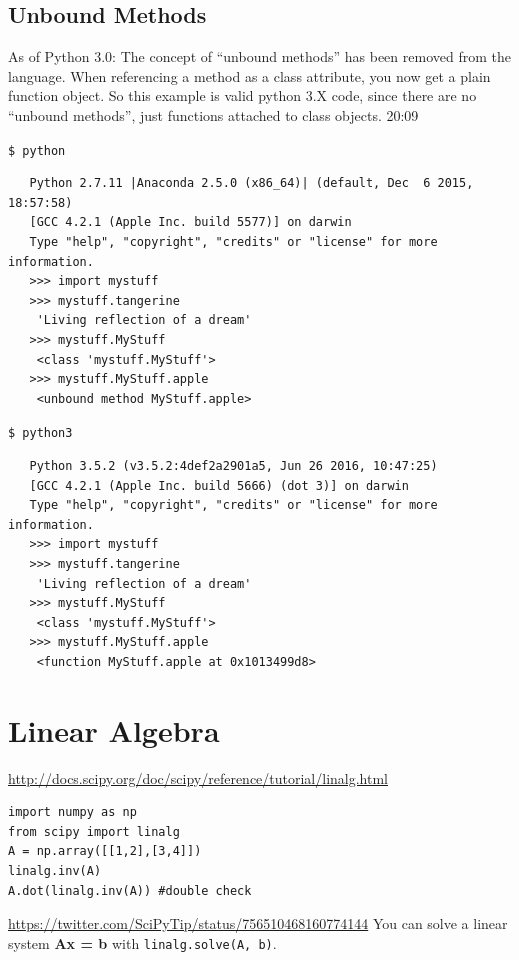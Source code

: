 \documentclass[11pt,a4paper]{article}
\begin{document}
     \subsection{Unbound Methods}
     As of Python 3.0: The concept of ``unbound methods'' has been
removed from the language. When referencing a method as a class
attribute, you now get a plain function object. So this example is
valid python 3.X code, since there are no ``unbound methods'', just
functions attached to class objects.  %
20:09

     {\tt \$ python}
    \begin{lstlisting}
   Python 2.7.11 |Anaconda 2.5.0 (x86_64)| (default, Dec  6 2015, 18:57:58) 
   [GCC 4.2.1 (Apple Inc. build 5577)] on darwin
   Type "help", "copyright", "credits" or "license" for more information.
   >>> import mystuff
   >>> mystuff.tangerine
    'Living reflection of a dream'
   >>> mystuff.MyStuff
    <class 'mystuff.MyStuff'>
   >>> mystuff.MyStuff.apple
    <unbound method MyStuff.apple>
     \end{lstlisting}

     {\tt \$ python3}
    \begin{lstlisting}
   Python 3.5.2 (v3.5.2:4def2a2901a5, Jun 26 2016, 10:47:25) 
   [GCC 4.2.1 (Apple Inc. build 5666) (dot 3)] on darwin
   Type "help", "copyright", "credits" or "license" for more information.
   >>> import mystuff
   >>> mystuff.tangerine
    'Living reflection of a dream'
   >>> mystuff.MyStuff
    <class 'mystuff.MyStuff'>
   >>> mystuff.MyStuff.apple
    <function MyStuff.apple at 0x1013499d8>
    \end{lstlisting}




\newpage
\section{Linear Algebra}
\href{http://docs.scipy.org/doc/scipy/reference/tutorial/linalg.html}{http://docs.scipy.org/doc/scipy/reference/tutorial/linalg.html}

\begin{lstlisting}
import numpy as np
from scipy import linalg
A = np.array([[1,2],[3,4]])
linalg.inv(A)
A.dot(linalg.inv(A)) #double check
\end{lstlisting}

\noindent
\href{https://twitter.com/SciPyTip/status/756510468160774144}{https://twitter.com/SciPyTip/status/756510468160774144}
You can solve a linear system {\bf Ax = b} with {\tt linalg.solve(A, b)}.
\begin{lstlisting}

\end{lstlisting}
\end{document}
